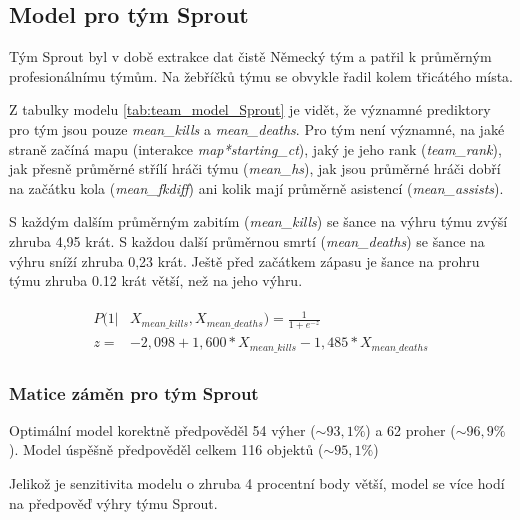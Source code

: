 

\subsection{Model pro tým Sprout}
Tým Sprout byl v době extrakce dat čistě Německý tým a patřil k průměrným profesionálnímu týmům. Na žebříčků týmu se obvykle řadil kolem třicátého místa.



Z tabulky modelu \ref{tab:team_model_Sprout} je vidět, že významné prediktory pro tým jsou pouze \textit{mean\_kills} a \textit{mean\_deaths}. Pro tým není významné,
na jaké straně začíná mapu (interakce \textit{map*starting\_ct}), jaký je jeho rank (\textit{team\_rank}), jak přesně průměrné střílí hráči týmu (\textit{mean\_hs}),
jak jsou průměrné hráči dobří na začátku kola (\textit{mean\_fkdiff}) ani kolik mají průměrně asistencí (\textit{mean\_assists}).



S každým dalším průměrným zabitím (\textit{mean\_kills}) se šance na výhru týmu zvýší zhruba 4,95 krát. S každou další průměrnou smrtí (\textit{mean\_deaths})
se šance na výhru sníží zhruba 0,23 krát. Ještě před začátkem zápasu je šance na prohru týmu zhruba 0.12 krát větší, než na jeho výhru.

\begin{align}
    \begin{split}
        P(1 | &X_{mean\_kills},  X_{mean\_deaths}) = \frac{1}{1 + e^{-z}} \\
        z = &-2,098 + 1,600*X_{mean\_kills} - 1,485*X_{mean\_deaths}
    \end{split}
\end{align}

\subsubsection{Matice záměn pro tým Sprout}



Optimální model korektně předpověděl 54 výher ($\sim 93,1\%$) a 62 proher ($\sim 96,9\%$). Model úspěšně předpověděl celkem 116 objektů ($\sim 95,1\%$)



Jelikož je senzitivita modelu o zhruba 4 procentní body větší, model se více hodí na předpověď výhry týmu Sprout.

